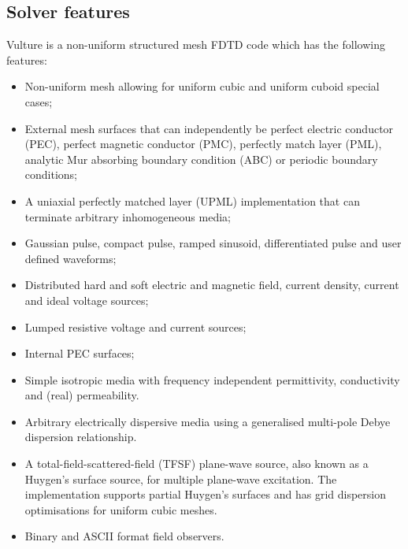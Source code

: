 \documentclass[onecolumn,a4paper]{article}
\numberwithin{equation}{section}
\begin{document}
\subsection{Solver features}

Vulture is a non-uniform structured mesh FDTD code which has the following features:
\begin{itemize}
 \item Non-uniform mesh allowing for uniform cubic and uniform cuboid special cases;
 \item External mesh surfaces that can independently be perfect electric conductor (PEC), 
 perfect magnetic conductor (PMC), perfectly match layer (PML), analytic Mur absorbing
 boundary condition (ABC) or periodic boundary conditions;
 \item A uniaxial perfectly matched layer (UPML) implementation that can terminate arbitrary inhomogeneous media;
 \item Gaussian pulse, compact pulse, ramped sinusoid, differentiated pulse and user defined waveforms;
 \item Distributed hard and soft electric and magnetic field, current density, current and ideal voltage sources;
 \item Lumped resistive voltage and current sources;
 \item Internal PEC surfaces;
 \item Simple isotropic media with frequency independent permittivity, conductivity and (real) permeability.
 \item Arbitrary electrically dispersive media using a generalised multi-pole Debye dispersion relationship.
 \item A total-field-scattered-field (TFSF) plane-wave source, also known as a Huygen's surface source, 
       for multiple plane-wave excitation. The implementation supports partial Huygen's surfaces
       and has grid dispersion optimisations for uniform cubic meshes.  
 \item Binary and ASCII format field observers.
\end{itemize}
\end{document}
